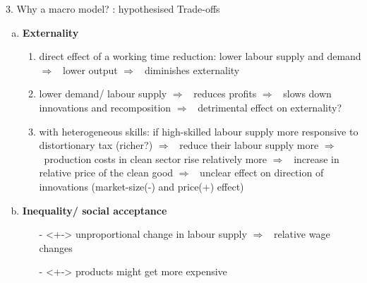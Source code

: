 \documentclass[11pt,aspectratio=169]{beamer}
\newcommand{\tr}[1]{\textcolor{blue}{#1}}
\newcommand{\ar}{$\Rightarrow$ \ }
\begin{document}
\begin{frame}{3. Why a macro model? : hypothesised Trade-offs}
\begin{enumerate}[a)]
\item \textbf{Externality}
\begin{enumerate}[1.] 
\item<+->  direct effect of a working time reduction: lower labour supply and demand \ar lower output \ar diminishes externality
\item<+-> lower demand/ labour supply \ar reduces profits \ar slows down innovations and recomposition \ar detrimental effect on externality?
\item<+-> with heterogeneous skills: if high-skilled labour supply more responsive to distortionary tax (richer?) \ar reduce their labour supply more \ar production costs in clean sector rise relatively more \ar increase in relative price of the clean good \ar unclear effect on direction of innovations 
(market-size(-) and price(+) effect)
	\end{enumerate}

\item<+->	\textbf{Inequality/ social acceptance}
	\begin{itemize}
\item[-]<+-> unproportional change in labour supply \ar relative wage changes
\item[-]<+-> products might get more expensive
	\end{itemize}
\end{enumerate}
\end{frame}
\end{document}
